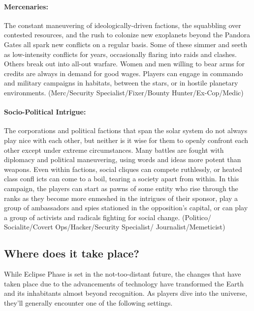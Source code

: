 \paragraph{Mercenaries:} The constant maneuvering of ideologically-driven factions, the squabbling over contested resources, and the rush to colonize new exoplanets beyond the Pandora Gates all spark new conflicts on a regular basis. Some of these simmer and seeth as low-intensity conflicts for years, occasionally flaring into raids and clashes. Others break out into all-out warfare. Women and men willing to bear arms for credits are always in demand for good wages. Players can engage in commando and military campaigns in habitats, between the stars, or in hostile planetary environments. (Merc/Security Specialist/Fixer/Bounty Hunter/Ex-Cop/Medic) 

\paragraph{Socio-Political Intrigue:} The corporations and political factions that span the solar system do not always play nice with each other, but neither is it wise for them to openly confront each other except under extreme circumstances. Many battles are fought with diplomacy and political maneuvering, using words and ideas more potent than weapons. Even within factions, social cliques can compete ruthlessly, or heated class confl icts can come to a boil, tearing a society apart from within. In this campaign, the players can start as pawns of some entity who rise through the ranks as they become more enmeshed in the intrigues of their sponsor, play a group of ambassadors and spies stationed in the opposition's capital, or can play a group of activists and radicals fighting for social change. (Politico/ Socialite/Covert Ops/Hacker/Security Specialist/ Journalist/Memeticist) 



\subsection{Where does it take place?} \label{sec:where-does-it} 

While Eclipse Phase is set in the not-too-distant future, the changes that have taken place due to the advancements of technology have transformed the Earth and its inhabitants almost beyond recognition. As players dive into the universe, they'll generally encounter one of the following settings. 




